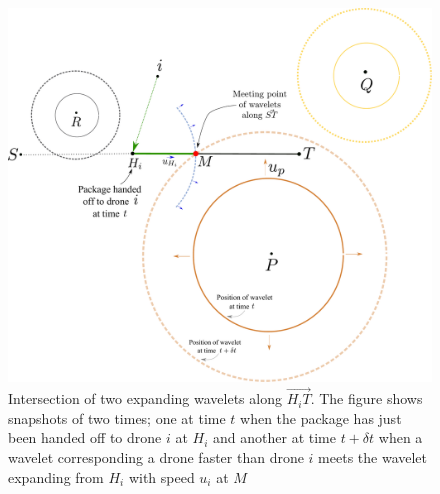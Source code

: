 \documentclass[12pt, english, oneside]{report}
\begin{document}
\begin{figure}[H]
\centering
\includegraphics[width=12cm]{docs/circular_wavelets_intersect_along_st.pdf}
\caption{Intersection of two expanding wavelets along $\vec{H_iT}$. The figure shows  snapshots of two times;
one at time $t$ when the package has just been handed off to drone $i$ at $H_i$ and another at time $t + \delta t$
when a wavelet corresponding a drone faster than drone $i$ meets the wavelet expanding from $H_i$ with speed $u_i$ 
at $M$}
\end{figure}
\end{document}
